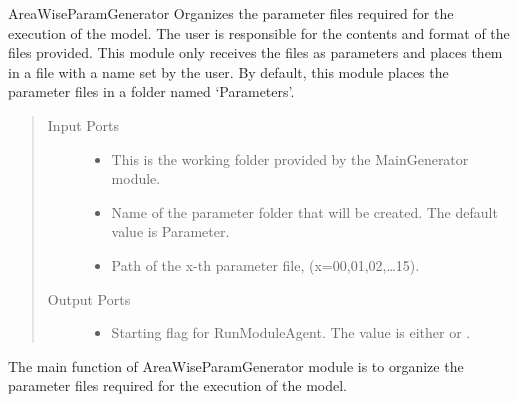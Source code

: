 \documentclass[letterpaper,10pt,english]{sphinxmanual}
\begin{document}
\begin{fulllineitems}
\label{\detokenize{AgentTools.GenericModelAgent:AgentTools.GenericModelAgent.AreaWiseParamGenerator.AreaWiseParamGenerator}}
AreaWiseParamGenerator Organizes the parameter files required for the execution of the model. 
The user is responsible for the contents and format of the files provided.
This module only receives the files as parameters and places them in a file with a name set by the user.
By default, this module places the parameter files in a folder named ‘Parameters’.
\begin{quote}\begin{description}
\item[{Input Ports}] \leavevmode\begin{itemize}
\item {} 
 This is the working folder provided by the MainGenerator module.

\item {} 
 Name of the parameter folder that will be created. The default value is Parameter.

\item {} 
 Path of the x-th parameter file, (x=00,01,02,…15).

\end{itemize}

\item[{Output Ports}] \leavevmode\begin{itemize}
\item {} 
 Starting flag for RunModuleAgent. The value is either  or .

\end{itemize}

\end{description}\end{quote}

\begin{fulllineitems}
\label{\detokenize{AgentTools.GenericModelAgent:AgentTools.GenericModelAgent.AreaWiseParamGenerator.AreaWiseParamGenerator.compute}}
The main function of AreaWiseParamGenerator module is to organize the parameter files required for the execution of the model.


\end{fulllineitems}
\end{fulllineitems}
\end{document}
